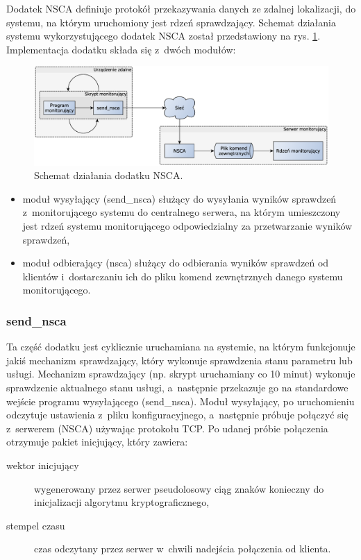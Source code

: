 Dodatek NSCA definiuje protokół przekazywania danych ze zdalnej
lokalizacji, do systemu, na którym uruchomiony jest rdzeń
sprawdzający. Schemat działania systemu wykorzystującego dodatek NSCA
został przedstawiony na rys. \ref{fig:nsca}. Implementacja dodatku składa
się z~dwóch modułów:

\begin{figure}[ht]
  \caption{Schemat działania dodatku NSCA.}
  \label{fig:nsca}
\includegraphics[width=1\textwidth]{img/nsca}
\end{figure}

\begin{itemize}
\item moduł wysyłający (send\_nsca) służący do wysyłania wyników
  sprawdzeń z~monitorującego systemu do centralnego serwera, na którym
  umieszczony jest rdzeń systemu monitorującego odpowiedzialny za
  przetwarzanie wyników sprawdzeń,
\item moduł odbierający (nsca) służący do odbierania wyników sprawdzeń
  od klientów i~dostarczaniu ich do pliku komend zewnętrznych danego
  systemu monitorującego.
\end{itemize}

\subsubsection[send\_nsca][send\_nsca]{send\_nsca}
\label{subsubsec:modulWysylajacy}

Ta część dodatku jest cyklicznie uruchamiana na systemie, na którym
funkcjonuje jakiś mechanizm sprawdzający, który wykonuje sprawdzenia
stanu parametru lub usługi. Mechanizm sprawdzający (np. skrypt
uruchamiany co 10 minut) wykonuje sprawdzenie aktualnego stanu usługi,
a~następnie przekazuje go na standardowe wejście programu
wysyłającego (send\_nsca). Moduł wysyłający, po uruchomieniu
odczytuje ustawienia z~pliku konfiguracyjnego, a~następnie próbuje
połączyć się z~serwerem (NSCA) używając protokołu TCP. Po udanej
próbie połączenia otrzymuje pakiet inicjujący, który zawiera:

\begin{description}
\item[wektor inicjujący] wygenerowany przez serwer pseudolosowy ciąg
  znaków konieczny do inicjalizacji algorytmu kryptograficznego,
\item[stempel czasu] czas odczytany przez serwer w~chwili nadejścia
  połączenia od klienta.
\end{description} 

